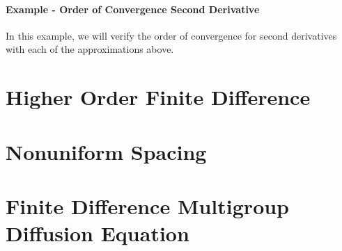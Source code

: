\paragraph{Example - Order of Convergence Second Derivative}

In this example, we will verify the order of convergence for second derivatives with each of the approximations above.
\section{Higher Order Finite Difference}

\section{Nonuniform Spacing}
\label{subsec:fdm_nonuniform}


\section{Finite Difference Multigroup Diffusion Equation}

